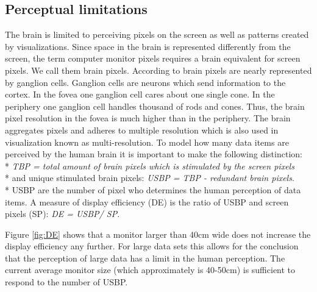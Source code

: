 \subsection{Perceptual limitations} \label{perception}
The brain is limited to perceiving pixels on the screen as well as patterns created by visualizations. Since space in the brain is represented differently from the screen, the term computer monitor pixels requires a brain equivalent for screen pixels. We call them brain pixels. According to  \cite{Ware2012} brain pixels are nearly represented by ganglion cells. Ganglion cells are neurons which send information to the cortex. In the fovea one ganglion cell cares about one single cone. In the periphery one ganglion cell handles thousand of rods and cones. Thus, the brain pixel resolution in the fovea is much higher than in the periphery. The brain aggregates pixels and adheres to multiple resolution which is also used in visualization known as multi-resolution.
To model how many data items are perceived by the human brain it is important to make the following distinction: 
\\*
\textit{\gls{TBP} = total amount of brain pixels which is stimulated by the screen pixels}\\*
and unique stimulated brain pixels: \textit{\gls{USBP} = \gls{TBP} - redundant brain pixels}.\\*
\gls{USBP} are the number of pixel who determines the human perception of data items. A measure of display efficiency (\gls{DE}) is the ratio of \gls{USBP} and screen pixels (\gls{SP}): \textit{\gls{DE} = \gls{USBP}/ \gls{SP}}.

Figure \ref{fig:DE} shows that a monitor larger than 40cm wide does not increase the display efficiency any further. For large data sets this allows for the conclusion that the perception of large data has a limit in the human perception. The current average monitor size (which approximately is  40-50cm) is sufficient to respond to the number of \gls{USBP}.

